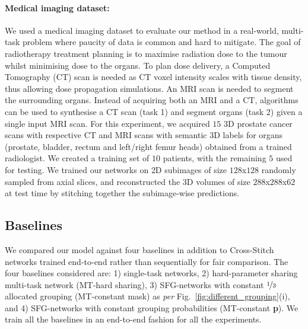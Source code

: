     \paragraph{Medical imaging dataset:} We used a medical imaging dataset to evaluate our method in a real-world, multi-task problem where paucity of data is common and hard to mitigate. The goal of radiotherapy treatment planning is to maximise radiation dose to the tumour whilst minimising dose to the organs. To plan dose delivery, a Computed Tomography (CT) scan is needed as CT voxel intensity scales with tissue density, thus allowing dose propagation simulations. An MRI scan is needed to segment the surrounding organs. Instead of acquiring both an MRI and a CT, algorithms can be used to synthesise a CT scan (task 1) and segment organs (task 2) given a single input MRI scan. For this experiment, we acquired $15$ 3D prostate cancer scans with respective CT and MRI scans with semantic 3D labels for organs (prostate, bladder, rectum and left/right femur heads) obtained from a trained radiologist. We created a training set of $10$ patients, with the remaining $5$ used for testing. We trained our networks on 2D subimages of size $128$x$128$ randomly sampled from axial slices, and reconstructed the 3D volumes of size $288$x$288$x$62$ at test time by stitching together the subimage-wise predictions.

\subsection{Baselines}
We compared our model against four baselines in addition to Cross-Stitch networks \cite{MisraCrossMTL16} trained end-to-end rather than sequentially for fair comparison. The four baselines considered are: 1) single-task networks, 2) hard-parameter sharing multi-task network (MT-hard sharing), 3) SFG-networks with constant $\nicefrac{1}{3}$ allocated grouping (MT-constant mask) as \textit{per} Fig.~\ref{fig:different_grouping}(i), and 4) SFG-networks with constant grouping probabilities (MT-constant \textbf{p}). We train all the baselines in an end-to-end fashion for all the experiments. 

